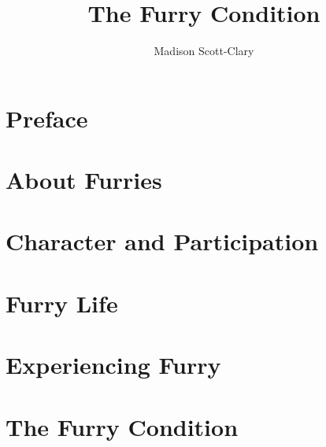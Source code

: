 \documentclass[12pt,letterpaper,oneside]{memoir}
\title{The Furry Condition}
\author{Madison Scott-Clary}
\begin{document}
  \frontmatter
  \maketitle

  \newpage

  \tableofcontents

  \chapter*{Preface}

  \mainmatter
  \chapter{About Furries}
  

  \chapter{Character and Participation}

  \chapter{Furry Life}

  \chapter{Experiencing Furry}

  \chapter{The Furry Condition}
\end{document}
